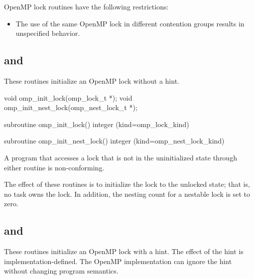 \restrictions
OpenMP lock routines have the following restrictions:

\begin{itemize}
\item The use of the same OpenMP lock in different contention groups results in 
unspecified behavior. 
\end{itemize}










\subsection{ and }
\label{subsec:omp_init_lock and omp_init_nest_lock}
\summary
These routines initialize an OpenMP lock without a hint.

\format
\ccppspecificstart
\begin{boxedcode}
void omp\_init\_lock(omp\_lock\_t *);
void omp\_init\_nest\_lock(omp\_nest\_lock\_t *);
\end{boxedcode}
\ccppspecificend

\fortranspecificstart
\begin{boxedcode}
subroutine omp\_init\_lock()
integer (kind=omp\_lock\_kind) 

subroutine omp\_init\_nest\_lock()
integer (kind=omp\_nest\_lock\_kind) 
\end{boxedcode}
\fortranspecificend

\constraints
A program that accesses a lock that is not in the uninitialized state through either routine 
is non-conforming.

\effect
The effect of these routines is to initialize the lock to the unlocked state; that is, no task 
owns the lock. In addition, the nesting count for a nestable lock is set to zero.











\subsection[\code{omp\_init\_lock\_with\_hint} and \code{omp\_init\_nest\_lock\_with\_hint}]{ and \\}
\label{subsec:omp_init_lock_with_hint and omp_init_nest_lock_with_hint}
\summary
These routines initialize an OpenMP lock with a hint.  
The effect of the hint is implementation-defined. The OpenMP implementation
can ignore the hint without changing program semantics.


